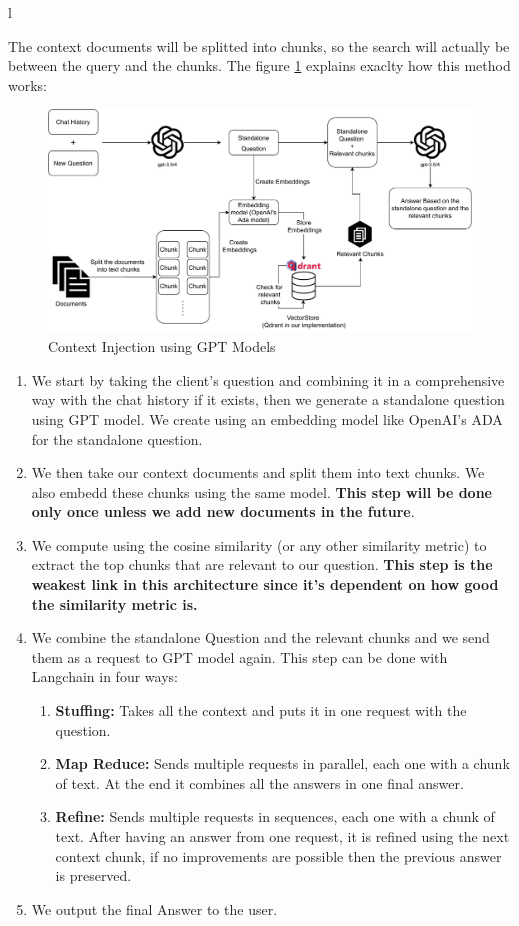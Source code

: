 l\documentclass[a4paper,12pt,twoside]{report}
\begin{document}
The context documents will be splitted into chunks, so the search will actually be between the query and the chunks. The figure \ref{chatbotArch} explains exaclty how this method works:
\begin{figure}[H]
		\includegraphics[width=\textwidth, keepaspectratio ]{images/gptLangchain}
	\caption[Context Injection using GPT Models]{Context Injection using GPT Models}
\label{chatbotArch}
\end{figure}	
\begin{enumerate}
\item We start by taking the client's question and combining it in a comprehensive way with the chat history if it exists, then we generate a standalone question using GPT model. We create using an embedding model like OpenAI's ADA for the standalone question.
\item We then take our context documents and split them into text chunks. We also embedd these chunks using the same model. \textbf{This step will be done only once unless we add new documents in the future}.
\item We compute using the cosine similarity (or any other similarity metric) to extract the top chunks that are relevant to our question. \textbf{This step is the weakest link in this architecture since it's dependent on how good the similarity metric is.}
\item We combine the standalone Question and the relevant chunks and we send them as a request to GPT model again. This step can be done with Langchain in four ways:
\begin{enumerate}
\item \textbf{Stuffing:} Takes all the context and puts it in one request with the question.
\item \textbf{Map Reduce:} Sends multiple requests in parallel, each one with a chunk of text. At the end it combines all the answers in one final answer.
\item \textbf{Refine:} Sends multiple requests in sequences, each one with a chunk of text. After having an answer from one request, it is refined using the next context chunk, if no improvements are possible then the previous answer is preserved.
\end{enumerate}
\item We output the final Answer to the user.
\end{enumerate}
\end{document}
